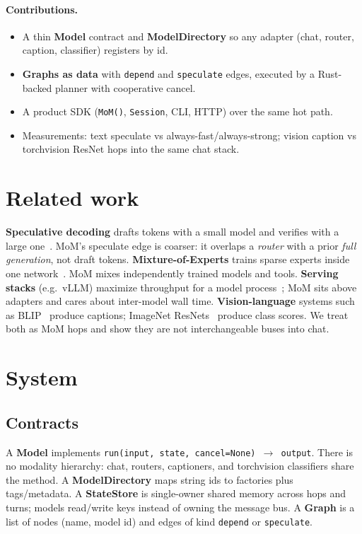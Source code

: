 \documentclass[11pt,a4paper]{article}
\begin{document}
\paragraph{Contributions.}
\begin{itemize}[leftmargin=*]
  \item A thin \textbf{Model} contract and \textbf{ModelDirectory} so any adapter (chat, router, caption, classifier) registers by id.
  \item \textbf{Graphs as data} with \texttt{depend} and \texttt{speculate} edges, executed by a Rust-backed planner with cooperative cancel.
  \item A product SDK (\texttt{MoM()}, \texttt{Session}, CLI, HTTP) over the same hot path.
  \item Measurements: text speculate vs always-fast/always-strong; vision caption vs torchvision ResNet hops into the same chat stack.
\end{itemize}

\section{Related work}
\label{sec:related}

\textbf{Speculative decoding} drafts tokens with a small model and verifies with a large one~\cite{leviathan2023speculative,chen2023accelerating}.
MoM's speculate edge is coarser: it overlaps a \emph{router} with a prior \emph{full generation}, not draft tokens.
\textbf{Mixture-of-Experts} trains sparse experts inside one network~\cite{shazeer2017moe}.
MoM mixes independently trained models and tools.
\textbf{Serving stacks} (e.g.\ vLLM) maximize throughput for a model process~\cite{kwon2023vllm}; MoM sits above adapters and cares about inter-model wall time.
\textbf{Vision-language} systems such as BLIP~\cite{li2023blip} produce captions; ImageNet ResNets~\cite{he2016resnet} produce class scores.
We treat both as MoM hops and show they are not interchangeable buses into chat.

\section{System}
\label{sec:system}

\subsection{Contracts}
A \textbf{Model} implements \texttt{run(input, state, cancel=None) $\rightarrow$ output}.
There is no modality hierarchy: chat, routers, captioners, and torchvision classifiers share the method.
A \textbf{ModelDirectory} maps string ids to factories plus tags/metadata.
A \textbf{StateStore} is single-owner shared memory across hops and turns; models read/write keys instead of owning the message bus.
A \textbf{Graph} is a list of nodes (name, model id) and edges of kind \texttt{depend} or \texttt{speculate}.
\end{document}
